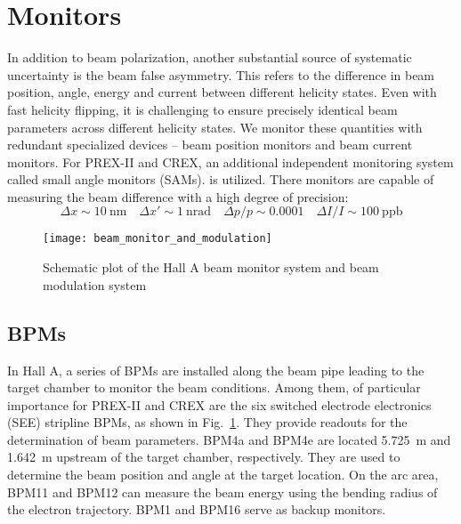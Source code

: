 \section{Monitors}
In addition to beam polarization, another substantial source of systematic uncertainty
is the beam false asymmetry. This refers to the difference in beam position, angle, energy and
current between different helicity states. Even with fast helicity flipping,
it is challenging to ensure precisely identical beam parameters across different helicity states.
We monitor these quantities with redundant specialized devices
-- beam position monitors and beam current monitors. For PREX-II
and CREX, an additional independent monitoring system called small angle monitors (SAMs).
is utilized.
There monitors are capable of measuring the beam difference with a high degree of
precision:
$$ \Delta x \sim 10\ \mathrm{nm} \quad \Delta x' \sim 1\ \mathrm{nrad} \quad \Delta p/p \sim 0.0001 \quad \Delta I/I \sim 100 \ \mathrm{ppb} $$
\begin{figure}[!h]
    \centering
    \texttt{[image: beam\_monitor\_and\_modulation]}
    \caption{Schematic plot of the Hall A beam monitor system and beam modulation system}
    \label{fig:hall_a_monitors_and_modulation}
\end{figure}

\begin{comment}
    \begin{itemize}
	\item beam correlations
	\item monitor precision (resolution): double difference width
	\item noise
	\item pedestal: calibration
	\item cross-correlation
    \end{itemize}
\end{comment}

\subsection{BPMs}
In Hall A, a series of BPMs are installed along the beam pipe leading to the target chamber
to monitor the beam conditions. Among them, of particular importance for PREX-II
and CREX are the six switched electrode electronics (SEE) stripline BPMs, as shown
in Fig.~\ref{fig:hall_a_monitors_and_modulation}. They provide readouts for the
determination of beam parameters.
BPM4a and BPM4e are located 5.725~m and 1.642~m upstream of the target chamber, respectively.
They are used to determine the beam position and angle at the target location. 
On the arc area, BPM11 and BPM12 can measure the beam energy using the bending 
radius of the electron trajectory. BPM1 and BPM16 serve as backup monitors.

